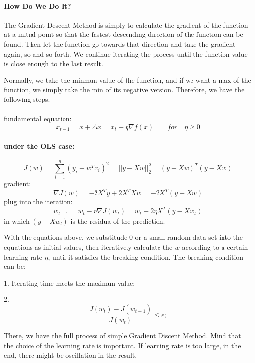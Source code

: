 \documentclass{article}
\begin{document}
	\paragraph{How Do We Do It?}
	The Gradient Descent Method is simply to calculate the gradient of the function at a initial point so that the fastest descending direction of the function can be found. Then let the function go towards that direction and take the gradient again, so and so forth. We continue iterating the process until the function value is close enough to the last result.

	Normally, we take the minmun value of the function, and if we want a max of the function, we simply take the min of its negative version. Therefore, we have the following steps.
	\\\\
	fundamental equation:
	\begin{displaymath}
		x_{t+1} = x + \Delta x = x_{t} - \eta \nabla f(x)\qquad for\quad \eta \ge 0
	\end{displaymath}
	\paragraph{under the OLS case:}
	\begin{displaymath}
		J(w) = \sum_{i=1}^{n}(y_i-w^Tx_i)^2 = ||y - Xw||^2_2 = (y-Xw)^T(y-Xw)
	\end{displaymath}
	gradient:\begin{displaymath}
		\nabla J(w) = -2X^Ty + 2X^TXw = -2X^T(y - Xw)
	\end{displaymath}
	plug into the iteration:\begin{displaymath}
		w_{t+1} = w_t - \eta \nabla J(w_t) = w_t + 2\eta X^T(y - Xw_t)
	\end{displaymath}
	in which $(y - Xw_t)$ is the residua of the prediction.

	With the equations above, we substitude 0 or a small random data set into the equations as initial values, then iteratively calculate the $w$ according to a certain learning rate $\eta$, until it satisfies the breaking condition. The breaking condition can be:

	1. Iterating time meets the maximun value;

	2.\begin{equation}
		\frac{J(w_t)-J(w_{t+1})}{J(w_t)} \le \epsilon;
	\end{equation}

	There, we have the full process of simple Gradient Discent Method. Mind that the choice of the learning rate is important. If learning rate is too large, in the end, there might be oscillation in the result.
\end{document}
